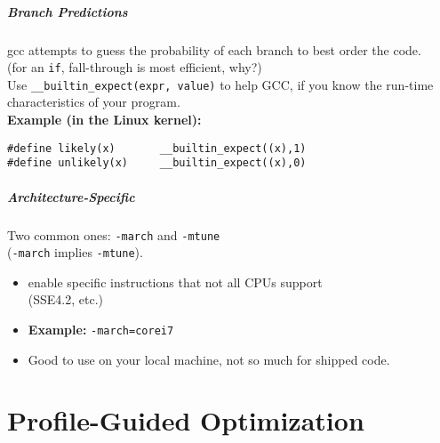 \documentclass[aspectratio=43]{beamer}
\newenvironment{changemargin}[1]{%
  \begin{list}{}{%
    \setlength{\topsep}{0pt}%
    \setlength{\leftmargin}{#1}%
    \setlength{\rightmargin}{1em}
    \setlength{\listparindent}{\parindent}%
    \setlength{\itemindent}{\parindent}%
    \setlength{\parsep}{\parskip}%
  }%
  \item[]}{\end{list}}
\begin{document}
\begin{frame}[fragile]
  \frametitle{Branch Predictions}

  \begin{changemargin}{2cm}
     gcc attempts to guess the probability of each branch to 
      best order the code.\\
     (for an {\tt if}, fall-through is most efficient, why?)\\[1em]

     Use {\tt \_\_builtin\_expect(expr, value)} to help GCC, if
      you know the run-time characteristics of your program.\\[1em]
  {\bf Example (in the Linux kernel):}

  \begin{lstlisting}
#define likely(x)       __builtin_expect((x),1)
#define unlikely(x)     __builtin_expect((x),0)
  \end{lstlisting}
  \end{changemargin}
\end{frame}

\begin{frame}
  \frametitle{Architecture-Specific}

  \begin{changemargin}{1.5cm}
  Two common ones: {\tt -march} and {\tt -mtune}\\ \qquad\qquad ({\tt -march} implies {\tt -mtune}).

  \begin{itemize}
    \item enable  specific instructions that not all CPUs  support\\
      \qquad \qquad (SSE4.2, etc.)
    \vfill
    \item {\bf Example:} {\tt -march=corei7}
    \vfill
    \item Good to use on your local machine, not so much for shipped code.
  \end{itemize}
  \end{changemargin}
\end{frame}

\part{Profile-Guided Optimization}
\frame{\partpage}
\end{document}
